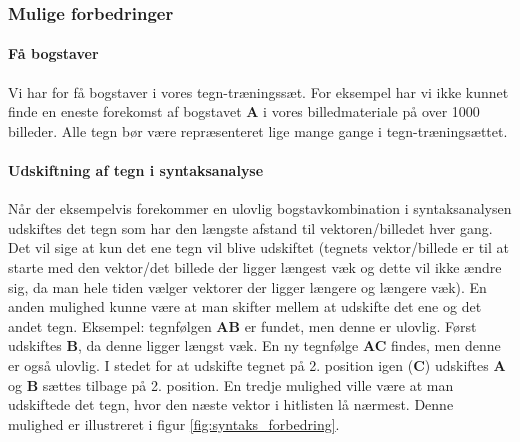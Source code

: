 \subsubsection{Mulige forbedringer}

\paragraph{Få bogstaver}
Vi har for få bogstaver i vores tegn-træningssæt. For eksempel har vi ikke kunnet finde en eneste forekomst af bogstavet \textbf{A} i vores billedmateriale på over 1000 billeder. Alle tegn bør være repræsenteret lige mange gange i tegn-træningsættet.

\paragraph{Udskiftning af tegn i syntaksanalyse}
Når der eksempelvis forekommer en ulovlig bogstavkombination i syntaksanalysen udskiftes det tegn som har den længste afstand til vektoren/billedet hver gang. Det vil sige at kun det ene tegn vil blive udskiftet (tegnets vektor/billede er til at starte med den vektor/det billede der ligger længest væk og dette vil ikke ændre sig, da man hele tiden vælger vektorer der ligger længere og længere væk). En anden mulighed kunne være at man skifter mellem at udskifte det ene og det andet tegn. Eksempel: tegnfølgen \textbf{AB} er fundet, men denne er ulovlig. Først udskiftes \textbf{B}, da denne ligger længst væk. En ny tegnfølge \textbf{AC} findes, men denne er også ulovlig. I stedet for at udskifte tegnet på 2. position igen (\textbf{C}) udskiftes \textbf{A} og \textbf{B} sættes tilbage på 2. position. En tredje mulighed ville være at man udskiftede det tegn, hvor den næste vektor i hitlisten lå nærmest. Denne mulighed er illustreret i figur \vref{fig:syntaks_forbedring}.


